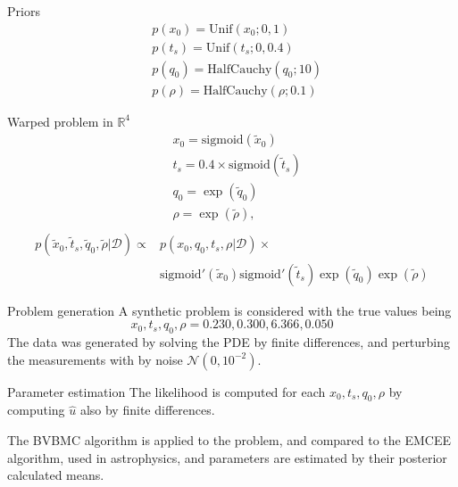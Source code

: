 \documentclass{beamer}
\begin{document}
\begin{frame}
\begin{block}{Priors}
\begin{equation*}
\begin{split}
& p(x_0) = \text{Unif}(x_0;0,1) \\ 
& p(t_s) = \text{Unif}(t_s;0,0.4) \\
& p(q_0) = \text{HalfCauchy}(q_0;10) \\ 
& p(\rho) = \text{HalfCauchy}(\rho;0.1)
\end{split}
\end{equation*}
\end{block}

\begin{block}{Warped problem in $\mathbb{R}^4$}
\begin{equation*}
\begin{split}
& x_0 = \text{sigmoid}(\tilde{x}_0) \\
& t_s = 0.4 \times \text{sigmoid}(\tilde{t}_s) \\
& q_0 = \exp(\tilde{q}_0) \\
& \rho = \exp(\tilde{\rho}), \\
\end{split}
\end{equation*}
\begin{equation*}
\begin{split}
p(\tilde{x}_0,\tilde{t}_s,\tilde{q}_0,\tilde{\rho}|\mathcal{D}) \propto & p(x_0,q_0,t_s,\rho|\mathcal{D}) \times \\ & \text{sigmoid}'(\tilde{x}_0) \text{sigmoid}'(\tilde{t}_s) \exp(\tilde{q}_0) \exp(\tilde{\rho})
\end{split}
\end{equation*}
\end{block}
\end{frame}
\begin{frame}
\begin{block}{Problem generation}
A synthetic problem is considered with the true values being
\begin{equation*}
x_0,t_s,q_0,\rho = 0.230,0.300,6.366,0.050
\end{equation*}
The data was generated by solving the PDE by finite differences, and perturbing the measurements with by noise $\mathcal{N}(0,10^{-2})$.
\end{block}
\begin{block}{Parameter estimation}
	The likelihood is computed for each $x_0,t_s,q_0,\rho$ by computing $\hat{u}$ also by finite differences.
	
	The BVBMC algorithm is applied to the problem, and compared to the EMCEE algorithm, used in astrophysics, and parameters are estimated by their posterior calculated means.
\end{block}
\end{frame}
\end{document}
